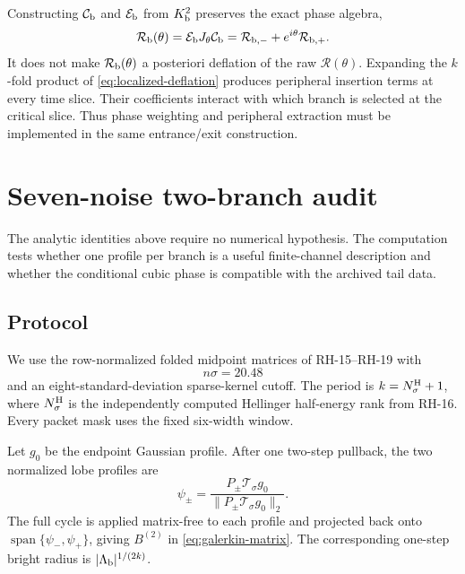 \documentclass[11pt]{article}
\theoremstyle{definition}
\theoremstyle{remark}
\newcommand{\cT}{\mathcal T}
\newcommand{\cR}{\mathcal R}
\newcommand{\cC}{\mathcal C}
\newcommand{\cE}{\mathcal E}
\begin{document}
Constructing $\cC_{\rm b}$ and $\cE_{\rm b}$ from $K_{\rm b}^2$ preserves
the exact phase algebra,
\begin{equation}\label{eq:deflated-phase-algebra}
 \cR_{\rm b}(\theta)
 =\cE_{\rm b}J_\theta\cC_{\rm b}
 =\cR_{{\rm b},-}+e^{i\theta}\cR_{{\rm b},+}.
\end{equation}
It does not make $\cR_{\rm b}(\theta)$ a posteriori deflation of the raw
$\cR(\theta)$.  Expanding the $k$-fold product of
\eqref{eq:localized-deflation} produces peripheral insertion terms at every
time slice.  Their coefficients interact with which branch is selected at
the critical slice.  Thus phase weighting and peripheral extraction must be
implemented in the same entrance/exit construction.

\section{Seven-noise two-branch audit}
\label{sec:numerics}

The analytic identities above require no numerical hypothesis.  The
computation tests whether one profile per branch is a useful finite-channel
description and whether the conditional cubic phase is compatible with the
archived tail data.

\subsection{Protocol}

We use the row-normalized folded midpoint matrices of RH-15--RH-19 with
\begin{equation}\label{eq:dimension-law}
 n\sigma=20.48
\end{equation}
and an eight-standard-deviation sparse-kernel cutoff.  The period is
$k=N_\sigma^{\rm H}+1$, where $N_\sigma^{\rm H}$ is the independently
computed Hellinger half-energy rank from RH-16.  Every packet mask uses the
fixed six-width window.

Let $g_0$ be the endpoint Gaussian profile.  After one two-step pullback, the
two normalized lobe profiles are
\begin{equation}\label{eq:numerical-profiles}
 \psi_\pm=
 \frac{P_\pm\cT_\sigma g_0}
 {\|P_\pm\cT_\sigma g_0\|_2}.
\end{equation}
The full cycle is applied matrix-free to each profile and projected back onto
$\operatorname{span}\{\psi_-,\psi_+\}$, giving
$B^{(2)}$ in \eqref{eq:galerkin-matrix}.  The corresponding one-step bright
radius is $|\Lambda_{\rm b}|^{1/(2k)}$.
\end{document}
